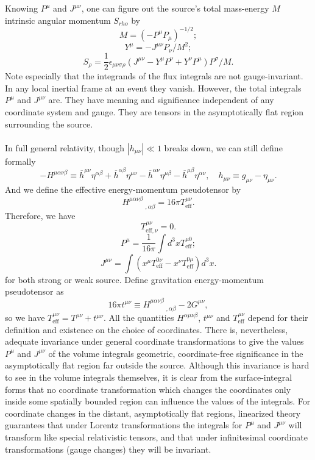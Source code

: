 \noindent
Knowing $P^{\mu}$ and $J^{\mu\nu}$, one can figure out the source's total mass-energy $M$ intrinsic angular momentum $S_{rho}$ by
\[M = (-P^{\mu}P_{\mu})^{-1/2};\]
\[Y^{\mu} = -J^{\mu\nu}P_{\nu}/M^2;\]
\[S_{\rho} = \frac{1}{2}\epsilon_{\mu\nu\sigma\rho}(J^{\mu\nu} - Y^{\mu}P^{\nu} + Y^{\nu}P^{\mu})P^{\sigma}/M.\]
Note especially that the integrands of the flux integrals  are not gauge-invariant. In any local inertial frame at an event they vanish. 
However, the total integrals $P^{\mu}$ and $J^{\mu\nu}$ are. 
They have meaning and significance independent of any coordinate system and gauge. They are tensors in the asymptotically flat region surrounding the source.
\\ \\
In full general relativity, though $|h_{\mu\nu}| \ll 1$ breaks down, we can still define formally
\[-H^{\mu\alpha\nu\beta} \equiv \overline{h}^{\mu\nu}\eta^{\alpha\beta} + \overline{h}^{\alpha\beta}\eta^{\mu\nu} - \overline{h}^{\alpha\nu}\eta^{\mu\beta} - \overline{h}^{\mu\beta}\eta^{\alpha\nu} , \quad h_{\mu\nu} \equiv g_{\mu\nu} - \eta_{\mu\nu}.\]
And we define the effective energy-momentum pseudotensor by
\[H^{\mu\alpha\nu\beta}_{\phantom{****},\alpha
\beta} = 16\pi T^{\mu\nu}_{\mathrm{eff}}.\]
Therefore, we have
\[T^{\mu\nu}_{\mathrm{eff},\nu} = 0.\]
\[P^{\mu} = \frac{1}{16\pi} \int d^3x T^{\mu0}_{\mathrm{eff}};\]
\[J^{\mu\nu} = \int (x^{\mu} T^{0\nu}_{\mathrm{eff}} - x^{\nu} T^{0\mu}_{\mathrm{eff}}) d^3x.\]
for both strong or weak source.
Define gravitation energy-momentum pseudotensor as
\[16\pi t^{\mu\nu} \equiv H^{\mu\alpha\nu\beta}_{\phantom{****},\alpha
\beta} - 2G^{\mu\nu},\]
so we have $T^{\mu\nu}_{\mathrm{eff}} = T^{\mu\nu} + t^{\mu\nu}$. 
All the quantities $H^{\alpha\mu\nu\beta}$, $t^{\mu\nu}$ and $T^{\mu\nu}_{\mathrm{eff}}$ depend for their definition and existence on the choice of coordinates.
There is, nevertheless, adequate invariance under general coordinate transformations to give the values $P^{\mu}$ and $J^{\mu\nu}$ of the volume integrals geometric, coordinate-free significance in the asymptotically flat region far outside the source.
Although this invariance is hard to see in the volume integrals themselves, it is clear from the surface-integral forms that no coordinate transformation which changes the coordinates only inside some spatially bounded region can influence the values of the integrals. 
For coordinate changes in the distant, asymptotically
flat regions, linearized theory guarantees that under Lorentz transformations the integrals for $P^{\mu}$ and $J^{\mu\nu}$ will transform like special relativistic tensors, and that under infinitesimal coordinate transformations (gauge changes) they will be invariant.
